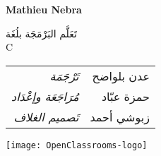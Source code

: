 \thispagestyle{empty}
\cleardoublepage
\thispagestyle{empty}
\begin{center}
{\fontsize{0.7cm}{1.4cm}\selectfont\bfseries
\textcolor{section}{\textenglish{Mathieu Nebra}}
}

\vspace{1cm}
\textcolor{chapter}{\mdseries
{\fontsize{2cm}{4cm}\selectfont
تَعَلَّم البَرْمَجَة بلُغَة}\\
{\fontsize{3cm}{6cm}\selectfont
\textenglish{C}
}
}

\vfill

{
\fontsize{0.5cm}{1.5cm}\selectfont

\begin{tabu} to 0.5
تَرْجَمَة & عدن بلواضح\\
مُرَاجَعَة وإعْدَاد & حمزة عبّاد\\
تَصميم الغلاف & زبوشي أحمد\\
\end{tabu}
}

\vfill
\texttt{[image: OpenClassrooms-logo]}
\end{center}
